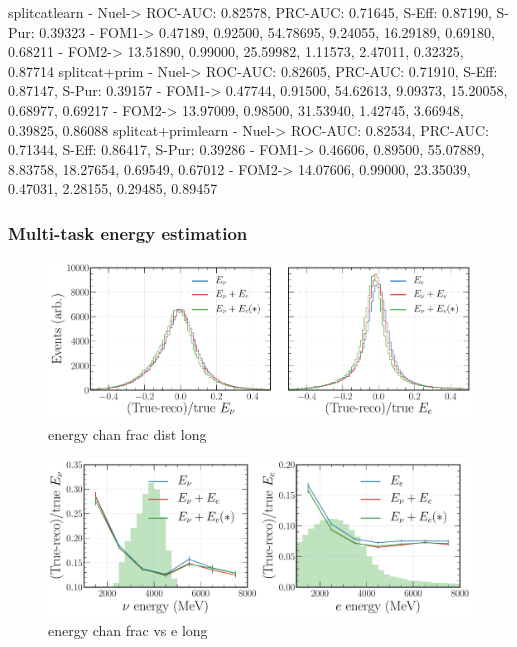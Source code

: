 splitcatlearn
- Nuel-> ROC-AUC: 0.82578, PRC-AUC: 0.71645, S-Eff: 0.87190, S-Pur: 0.39323
- FOM1-> 0.47189, 0.92500, 54.78695, 9.24055, 16.29189, 0.69180, 0.68211
- FOM2-> 13.51890, 0.99000, 25.59982, 1.11573, 2.47011, 0.32325, 0.87714
splitcat+prim
- Nuel-> ROC-AUC: 0.82605, PRC-AUC: 0.71910, S-Eff: 0.87147, S-Pur: 0.39157
- FOM1-> 0.47744, 0.91500, 54.62613, 9.09373, 15.20058, 0.68977, 0.69217
- FOM2-> 13.97009, 0.98500, 31.53940, 1.42745, 3.66948, 0.39825, 0.86088
splitcat+primlearn
- Nuel-> ROC-AUC: 0.82534, PRC-AUC: 0.71344, S-Eff: 0.86417, S-Pur: 0.39286
- FOM1-> 0.46606, 0.89500, 55.07889, 8.83758, 18.27654, 0.69549, 0.67012
- FOM2-> 14.07606, 0.99000, 23.35039, 0.47031, 2.28155, 0.29485, 0.89457

\subsubsection*{Multi-task energy estimation} %

\begin{figure} %
    \includegraphics[width=\textwidth]{diagrams/6-cvn/chipsnet/energy_chan_frac_dist.pdf}
    \caption[energy chan frac dist short]
    {energy chan frac dist long}
    \label{fig:energy_chan_frac_dist}
\end{figure}

\begin{figure} %
    \includegraphics[width=\textwidth]{diagrams/6-cvn/chipsnet/energy_chan_frac_vs_e.pdf}
    \caption[energy chan frac vs e short]
    {energy chan frac vs e long}
    \label{fig:energy_chan_frac_vs_e}
\end{figure}

